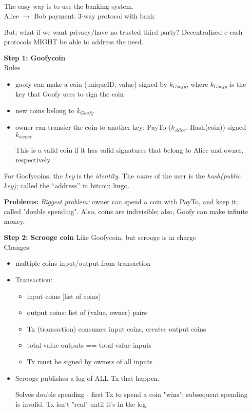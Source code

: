 
The easy way is to use the banking system.\\
Alice $\rightarrow$ Bob payment: 3-way protocol with bank

But: what if we want privacy/have no trusted third party?  Decentralized e-cash protocols MIGHT be able to address the need.

\textbf{Step 1: Goofycoin}\\
Rules
\begin{itemize}
	\item goofy can make a coin (uniqueID, value) signed by $k_{Goofy}$, where $k_{Goofy}$ is the key that Goofy uses to sign the coin
	\item new coins belong to $k_{Goofy}$
	\item owner can transfer the coin to another key: PayTo ($k_{Alice}$, Hash(coin)) signed $k_{owner}$
	
	This is a valid coin if it has valid signatures that belong to Alice and owner, respectively
\end{itemize}

For Goofycoins, the \textit{key} is the \textit{identity}. The \textit{name} of the user is the \textit{hash(public key)}; called the ``address'' in bitcoin lingo.

\textbf{Problems:}
\textit{Biggest problem: }owner can spend a coin with PayTo, and keep it; called "double spending". Also, coins are indivisible; also, Goofy can make infinite money.

\textbf{Step 2: Scrooge coin}
Like Goofycoin, but scrooge is in charge\\
Changes:
\begin{itemize}
	\item multiple coins input/output from transaction
	\item Transaction:
	\begin{itemize}
		\item input coins [list of coins]
		\item output coins: list of (value, owner) pairs
		\item Tx (transaction) consumes input coins, creates output coins
		\item total value outputs == total value inputs
		\item Tx must be signed by owners of all inputs
	\end{itemize}
	\item Scrooge publishes a log of ALL Tx that happen.

	Solves double spending - first Tx to spend a coin "wins"; subsequent spending is invalid. Tx isn't "real" until it's in the log
\end{itemize}

